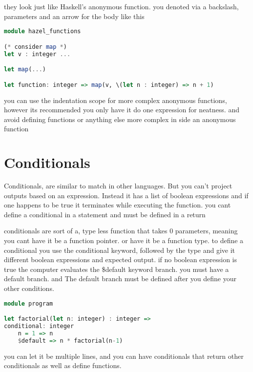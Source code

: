 \documentclass{article}
\begin{document}
they look just like Haskell's anonymous function.
you denoted via a backslash, parameters and an arrow for the body like this

\begin{lstlisting}[language=Haskell]
module hazel_functions

(* consider map *)
let v : integer ...

let map(...)

let function: integer => map(v, \(let n : integer) => n + 1)

\end{lstlisting}

you can use the indentation scope for more complex anonymous functions, however its recommended you only have it do one expression for neatness. and avoid defining functions or anything else more complex in side an anonymous function

\section{Conditionals}

Conditionals, are similar to match in other languages. But you can't project outputs based on an expression. Instead it has a list of boolean expressions and if one happens to be true it terminates while executing the function. you cant define a conditional in a statement and must be defined in a return

conditionals are sort of a, type less function that takes 0 parameters, meaning you cant have it be a function pointer. or have it be a function type.  
to define a conditional you use the conditional keyword, followed by the type and give it different boolean expressions and expected output. if no boolean expression is true the computer evaluates the \$default keyword branch. 
you must have a default branch. and The default branch must be defined after you define your other conditions.

\begin{lstlisting}[language=Haskell, caption=How to define a conditional]
module program

let factorial(let n: integer) : integer =>
conditional: integer 
    n = 1 => n
    $default => n * factorial(n-1)	

\end{lstlisting}

you can let it be multiple lines, and you can have conditionals that return other conditionals
as well as define functions.
\end{document}
